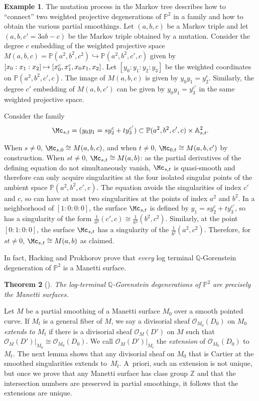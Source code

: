 \documentclass[JEP,XML,SOM,Unicode,NoFloatCountersInSection,published]{cedram}
\newcommand\mto{\mathchoice{\longmapsto}{\mapsto}{\mapsto}{\mapsto}}
\theoremstyle{plain}
\newtheorem{theorem}{Theorem}[section]
\theoremstyle{definition}
\newtheorem{example}[theorem]{Example}
\renewcommand\AA{{\mathbb A}}
\newcommand\PP{{\mathbb{P}}}
\newcommand\QQ{{\mathbb Q}}
\newcommand\ZZ{{\mathbb Z}}
\newcommand\Oc{{\mathcal O}}
\begin{document}
\begin{example}\label{ex:partialsmoothingconstruction}
The mutation process in the Markov tree describes how to ``connect'' two weighted projective degenerations of $\PP^2$ in a family and how to obtain the various partial smoothings. Let $(a,b,c)$ be a Markov triple and let $(a,b,c' = 3ab-c)$ be the Markov triple obtained by a mutation. Consider the degree $c$ embedding of the weighted projective space $M(a,b,c) = \PP(a^2,b^2,c^2) \hookrightarrow \PP(a^2,b^2,c',c)$ given by \hbox{$[x_0:x_1:x_2] \mto [x_0^c, x_1^c, x_0x_1, x_2 ]$}. Let $[y_0:y_1:y_2:y_3]$ be the weighted coordinates on $\PP(a^2,b^2,c',c)$. The image of $M(a,b,c)$ is given by $y_0y_1 = y_2^c$. Similarly, the degree $c'$ embedding of $M(a,b,c')$ can be given by $y_0y_1 = y_3^{c'}$ in the same weighted projective space.

Consider the family \[ \Mc_{s,t} = (y_0y_1 = sy_2^c + ty_3^{c'}) \subset \PP(a^2,b^2,c',c) \times \AA^2_{s,t}.\]

\noindent When $s \ne 0$, $\Mc_{s,0} \cong M(a,b,c)$, and when $t \ne 0$, $\Mc_{0,t} \cong M(a,b,c')$ by construction. When $st \ne 0$, $\Mc_{s,t} \cong M(a,b)$: as the partial derivatives of the defining equation do not simultaneously vanish, $\Mc_{s,t}$ is quasi-smooth and therefore can only acquire singularities at the four isolated singular points of the ambient space $\PP(a^2,b^2,c',c)$. The equation avoids the singularities of index $c'$ and $c$, so can have at most two singularities at the points of index $a^2$ and $b^2$. In a neighborhood of $[1:0:0:0]$, the surface $\Mc_{s,t}$ is defined by $y_1 = sy_2^c + ty_3^{c'}$, so has a singularity of the form $\frac{1}{a^2}(c',c) \cong \frac{1}{a^2}(b^2,c^2)$. Similarly, at the point $[0:1:0:0]$, the surface $\Mc_{s,t}$ has a singularity of the $\frac{1}{b^2}(a^2,c^2)$. Therefore, for $st \ne 0$, $\Mc_{s,t} \cong M(a,b)$ as claimed.
\end{example}

In fact, Hacking and Prokhorov prove that \textit{every} log terminal $\QQ$-Gorenstein degeneration of $\PP^2$ is a Manetti surface.

\begin{theorem}[{\cite[Cor.\,1.2]{HackProk}}]\label{thm:manettisurfaces}
The log-terminal $\QQ$-Gorenstein degenerations of $\PP^2$ are precisely the Manetti surfaces.
\end{theorem}

Let $M$ be a partial smoothing of a Manetti surface $M_0$ over a smooth pointed curve. If $M_t$ is a general fiber of $M$, we say a divisorial sheaf $\Oc_{M_0}(D_0)$ on $M_0$ \textit{extends to $M_t$} if there is a divisorial sheaf $\Oc_{M}(D')$ on $M$ such that $\Oc_{M}(D')|_{M_0} \cong \Oc_{M_0}(D_0)$. We call $\Oc_{M}(D')|_{M_t}$ the \textit{extension} of $\Oc_{M_0}(D_0)$ to $M_t$. The next lemma shows that any divisorial sheaf on $M_0$ that is Cartier at the smoothed singularities extends to~$M_t$. A~priori, such an extension is not unique, but once we prove that any Manetti surface has class group $\ZZ$ and that the intersection numbers are preserved in partial smoothings, it follows that the extensions are unique.
\end{document}
